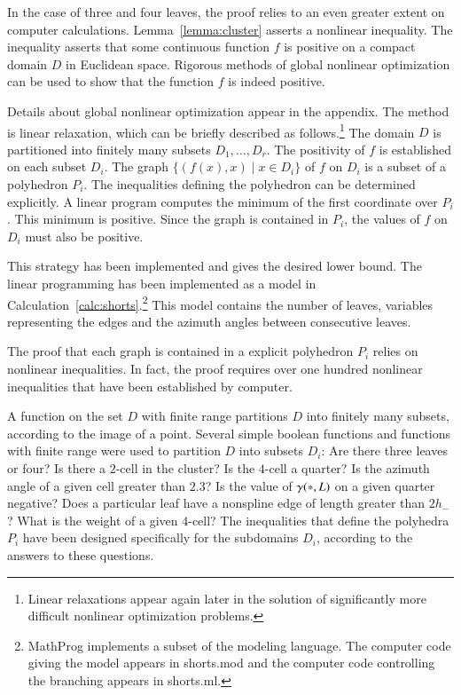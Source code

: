 In the case of three and four leaves, the proof relies to an even
greater extent on computer calculations.  
Lemma~\ref{lemma:cluster} asserts a nonlinear inequality.  The inequality
asserts that some continuous function $f$ is positive on a compact
domain $D$ in Euclidean space.  Rigorous methods of global nonlinear
optimization can be used to show that the function $f$ is indeed
positive.

Details about global nonlinear optimization appear in the appendix.
The method is linear relaxation, which can be briefly described as
follows.\footnote{Linear relaxations appear again later in the
solution of significantly more difficult nonlinear optimization
problems.}  The domain $D$ is partitioned into finitely many subsets
$D_1,\ldots, D_r$.  The positivity of $f$ is established on each
subset $D_i$.  The graph $\{(f(x), x)\mid x\in D_i\}$ of $f$ on $D_i$
is a subset of a polyhedron $P_i$.  The inequalities defining the
polyhedron can be determined explicitly.  A linear program computes
the minimum of the first coordinate over $P_i$.  This minimum is
positive.  Since the graph is contained in $P_i$, the values of $f$ on
$D_i$ must also be positive.

This strategy has been implemented and gives the desired lower bound.
The linear programming has been implemented as a  model
in Calculation~\ref{calc:shorts}.\footnote{MathProg implements a
subset of the  modeling language.  The computer code
giving the model appears in shorts.mod and the computer code
controlling the branching appears in shorts.ml.}  This model
contains the number of leaves, variables representing the edges and
the azimuth angles between consecutive leaves.

The proof that each graph is contained in a explicit polyhedron $P_i$
relies on nonlinear inequalities.  In fact, the proof requires over
one hundred nonlinear inequalities that have been established by
computer.

A function on the set $D$ with finite range partitions $D$ into
finitely many subsets, according to the image of a point.  Several
simple boolean functions and functions with finite range were used to
partition $D$ into subsets $D_i$: Are there three leaves or four?  Is
there a $2$-cell in the cluster?  Is the $4$-cell a quarter?  Is the
azimuth angle of a given cell greater than $2.3$?  Is the value of
$\gamma({*},L)$ on a given quarter negative? Does a particular leaf have a
nonspline edge of length greater than $2h_-$?  What is the weight of a
given $4$-cell?  The inequalities that define the polyhedra $P_i$ have
been designed specifically for the subdomains $D_i$, according to the
answers to these questions.

